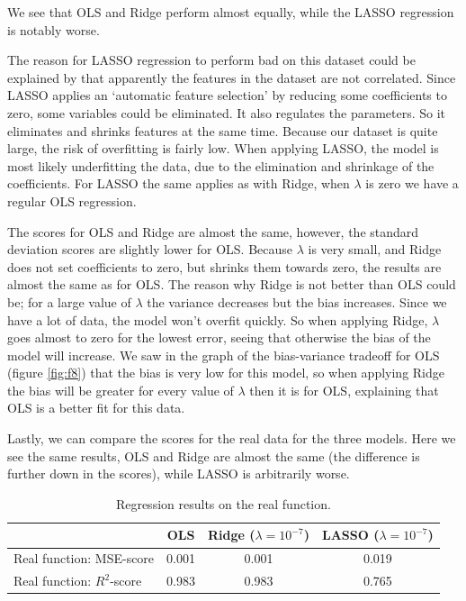 \documentclass[12pt]{extarticle}
\begin{document}
We see that OLS and Ridge perform almost equally, while the LASSO regression is notably worse.

The reason for LASSO regression to perform bad on this dataset could be explained by that apparently the features in the dataset are not correlated. Since LASSO applies an ‘automatic feature selection’ by reducing some coefficients to zero, some variables could be eliminated. It also regulates the parameters. So it eliminates and shrinks features at the same time. Because our dataset is quite large, the risk of overfitting is fairly low. When applying LASSO, the model is most likely underfitting the data, due to the elimination and shrinkage of the coefficients. For LASSO the same applies as with Ridge, when $\lambda$ is zero we have a regular OLS regression.  

The scores for OLS and Ridge are almost the same, however, the standard deviation scores are slightly lower for OLS. Because $\lambda$ is very small, and Ridge does not set coefficients to zero, but shrinks them towards zero, the results are almost the same as for OLS. The reason why Ridge is not better than OLS could be; for a large value of $\lambda$ the variance decreases but the bias increases. Since we have a lot of data, the model won’t overfit quickly. So when applying Ridge, $\lambda$ goes almost to zero for the lowest error, seeing that otherwise the bias of the model will increase. We saw in the graph of the bias-variance tradeoff for OLS (figure \ref{fig:f8}) that the bias is very low for this model, so when applying Ridge the bias will be greater for every value of $\lambda$ then it is for OLS, explaining that OLS is a better fit for this data. 

Lastly, we can compare the scores for the real data for the three models. Here we see the same results, OLS and Ridge are almost the same (the difference is further down in the scores), while LASSO is arbitrarily worse.

\begin{table}
  \begin{center}
    \caption{Regression results on the real function.}
    \label{tab:table9}
    \begin{tabular}{l|c|c|c} 
      & \textbf{OLS} & \textbf{Ridge} ($\lambda = 10^{-7}$) & \textbf{LASSO} ($\lambda = 10^{-7}$)\\
      \hline
      Real function: MSE-score & 0.001 & 0.001 & 0.019\\
      Real function: $R^2$-score & 0.983 & 0.983 & 0.765\\
    \end{tabular}
  \end{center}
\end{table}
\end{document}
